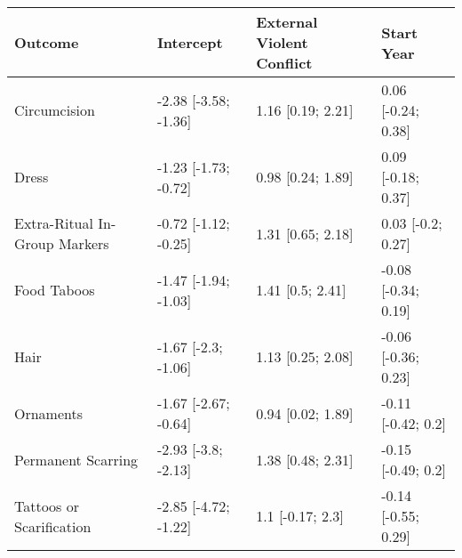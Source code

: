 \begin{tabular}{llll}
\toprule
Outcome & Intercept & External Violent Conflict & Start Year \\
\midrule
Circumcision & -2.38 [-3.58; -1.36] & 1.16 [0.19; 2.21] & 0.06 [-0.24; 0.38] \\
Dress & -1.23 [-1.73; -0.72] & 0.98 [0.24; 1.89] & 0.09 [-0.18; 0.37] \\
Extra-Ritual In-Group Markers & -0.72 [-1.12; -0.25] & 1.31 [0.65; 2.18] & 0.03 [-0.2; 0.27] \\
Food Taboos & -1.47 [-1.94; -1.03] & 1.41 [0.5; 2.41] & -0.08 [-0.34; 0.19] \\
Hair & -1.67 [-2.3; -1.06] & 1.13 [0.25; 2.08] & -0.06 [-0.36; 0.23] \\
Ornaments & -1.67 [-2.67; -0.64] & 0.94 [0.02; 1.89] & -0.11 [-0.42; 0.2] \\
Permanent Scarring & -2.93 [-3.8; -2.13] & 1.38 [0.48; 2.31] & -0.15 [-0.49; 0.2] \\
Tattoos or Scarification & -2.85 [-4.72; -1.22] & 1.1 [-0.17; 2.3] & -0.14 [-0.55; 0.29] \\
\bottomrule
\end{tabular}
